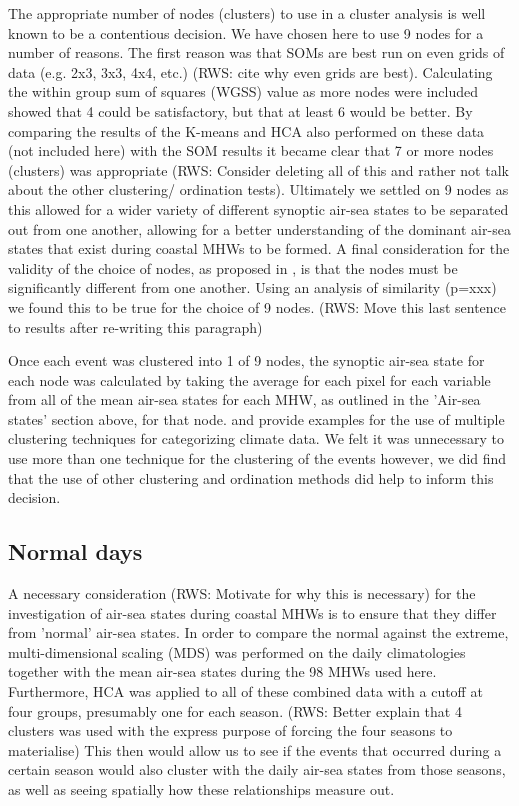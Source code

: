 \documentclass[a4paper,10pt,review]{elsarticle}
\begin{document}
The appropriate number of nodes (clusters) to use in a cluster analysis is well known to be a contentious decision. We have chosen here to use 9 nodes for a number of reasons. The first reason was that SOMs are best run on even grids of data (e.g. 2x3, 3x3, 4x4, etc.) (RWS: cite why even grids are best). Calculating the within group sum of squares (WGSS) value as more nodes were included showed that 4 could be satisfactory, but that at least 6 would be better. By comparing the results of the K-means and HCA also performed on these data (not included here) with the SOM results it became clear that 7 or more nodes (clusters) was appropriate (RWS: Consider deleting all of this and rather not talk about the other clustering/ ordination tests). Ultimately we settled on 9 nodes as this allowed for a wider variety of different synoptic air-sea states to be separated out from one another, allowing for a better understanding of the dominant air-sea states that exist during coastal MHWs to be formed. A final consideration for the validity of the choice of nodes, as proposed in \citet{Johnson2013}, is that the nodes must be significantly different from one another. Using an analysis of similarity (p=xxx) we found this to be true for the choice of 9 nodes. (RWS: Move this last sentence to results after re-writing this paragraph)

Once each event was clustered into 1 of 9 nodes, the synoptic air-sea state for each node was calculated by taking the average for each pixel for each variable from all of the mean air-sea states for each MHW, as outlined in the 'Air-sea states' section above, for that node. \citet{Ambroise2000} and \citet{Ramos2001} provide examples for the use of multiple clustering techniques for categorizing climate data. We felt it was unnecessary to use more than one technique for the clustering of the events however, we did find that the use of other clustering and ordination methods did help to inform this decision.

\subsection{Normal days}
A necessary consideration (RWS: Motivate for why this is necessary) for the investigation of air-sea states during coastal MHWs is to ensure that they differ from 'normal' air-sea states. In order to compare the normal against the extreme, multi-dimensional scaling (MDS) was performed on the daily climatologies together with the mean air-sea states during the 98 MHWs used here. Furthermore, HCA was applied to all of these combined data with a cutoff at four groups, presumably one for each season. (RWS: Better explain that 4 clusters was used with the express purpose of forcing the four seasons to materialise) This then would allow us to see if the events that occurred during a certain season would also cluster with the daily air-sea states from those seasons, as well as seeing spatially how these relationships measure out.
\end{document}
